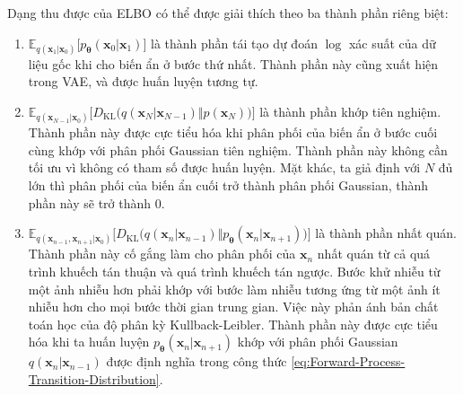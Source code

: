 \documentclass[14pt, a4paper]{article}
\numberwithin{equation}{section}
\numberwithin{figure}{section}
\numberwithin{dl}{section}
\numberwithin{md}{section}
\numberwithin{bd}{section}
\numberwithin{dn}{section}
\numberwithin{hq}{section}
\begin{document}
    Dạng thu được của ELBO có thể được giải thích theo ba thành phần riêng biệt:

    \begin{enumerate}
        \item $\mathbb{E}_{q(\boldsymbol{x}_{1} \vert \boldsymbol{x}_0)} \lbrack p_{\boldsymbol{\theta}} (\boldsymbol{x}_0 \vert \boldsymbol{x}_1) \rbrack$ là thành phần tái tạo dự đoán $\log$ xác suất của dữ liệu gốc khi cho biến ẩn ở bước thứ nhất.
        Thành phần này cũng xuất hiện trong VAE, và được huấn luyện tương tự.
        \item $\mathbb{E}_{q(\boldsymbol{x}_{N-1} \vert \boldsymbol{x}_0)} \lbrack D_{\mathrm{KL}} \big( q(\boldsymbol{x}_N \vert \boldsymbol{x}_{N-1}) \Vert p(\boldsymbol{x}_N) \big) \rbrack$ là thành phần khớp tiên nghiệm.
        Thành phần này được cực tiểu hóa khi phân phối của biến ẩn ở bước cuối cùng khớp với phân phối Gaussian tiên nghiệm.
        Thành phần này không cần tối ưu vì không có tham số được huấn luyện.
        Mặt khác, ta giả định với $N$ đủ lớn thì phân phối của biến ẩn cuối trở thành phân phối Gaussian, thành phần này sẽ trở thành 0.
        \item $\mathbb{E}_{q(\boldsymbol{x}_{n-1}, \boldsymbol{x}_{n+1} \vert \boldsymbol{x}_0)} \lbrack D_{\mathrm{KL}} \big( q(\boldsymbol{x}_n \vert \boldsymbol{x}_{n-1}) \Vert p_{\boldsymbol{\theta}} (\boldsymbol{x}_n \vert \boldsymbol{x}_{n+1}) \big) \rbrack$ là thành phần nhất quán.
        Thành phần này cố gắng làm cho phân phối của $\boldsymbol{x}_n$ nhất quán từ cả quá trình khuếch tán thuận và quá trình khuếch tán ngược.
        Bước khử nhiễu từ một ảnh nhiễu hơn phải khớp với bước làm nhiễu tương ứng từ một ảnh ít nhiễu hơn cho mọi bước thời gian trung gian.
        Việc này phản ánh bản chất toán học của độ phân kỳ Kullback-Leibler.
        Thành phần này được cực tiểu hóa khi ta huấn luyện $p_{\boldsymbol{\theta}} (\boldsymbol{x}_n \vert \boldsymbol{x}_{n+1})$ khớp với phân phối Gaussian $q(\boldsymbol{x}_{n} \vert \boldsymbol{x}_{n-1})$ được định nghĩa trong công thức \ref{eq:Forward-Process-Transition-Distribution}.
    \end{enumerate}
\end{document}
